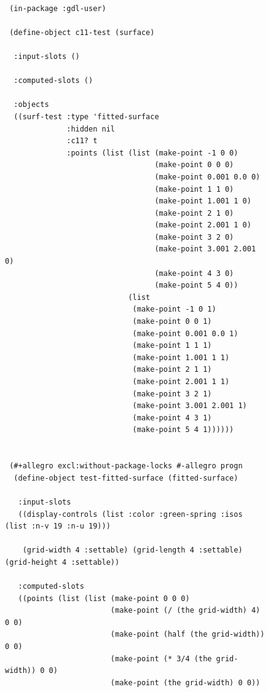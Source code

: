 \documentclass [11pt]{book}
\begin{document}
\begin{itemize}
\begin{description}
\end{description}




\begin{figure}
\begin{lrbox}{\boxedverb}
\begin{minipage}{\linewidth}
{\small

\begin{verbatim}

 (in-package :gdl-user)

 (define-object c11-test (surface) 

  :input-slots () 

  :computed-slots ()

  :objects
  ((surf-test :type 'fitted-surface
              :hidden nil
              :c11? t
              :points (list (list (make-point -1 0 0)
                                  (make-point 0 0 0) 
                                  (make-point 0.001 0.0 0)
                                  (make-point 1 1 0)
                                  (make-point 1.001 1 0)
                                  (make-point 2 1 0)
                                  (make-point 2.001 1 0)
                                  (make-point 3 2 0)
                                  (make-point 3.001 2.001 0)
                                  (make-point 4 3 0) 
                                  (make-point 5 4 0))   
                            (list
                             (make-point -1 0 1)
                             (make-point 0 0 1) 
                             (make-point 0.001 0.0 1)
                             (make-point 1 1 1)
                             (make-point 1.001 1 1)
                             (make-point 2 1 1)
                             (make-point 2.001 1 1)
                             (make-point 3 2 1)
                             (make-point 3.001 2.001 1)
                             (make-point 4 3 1)
                             (make-point 5 4 1))))))


 (#+allegro excl:without-package-locks #-allegro progn
  (define-object test-fitted-surface (fitted-surface) 

   :input-slots
   ((display-controls (list :color :green-spring :isos (list :n-v 19 :n-u 19)))
   
    (grid-width 4 :settable) (grid-length 4 :settable) (grid-height 4 :settable))
  
   :computed-slots
   ((points (list (list (make-point 0 0 0)
                        (make-point (/ (the grid-width) 4) 0 0)
                        (make-point (half (the grid-width)) 0 0)
                        (make-point (* 3/4 (the grid-width)) 0 0)
                        (make-point (the grid-width) 0 0))
                         

\end{verbatim}}
\end{minipage}
\end{lrbox}
\end{figure}
\end{itemize}
\end{document}
